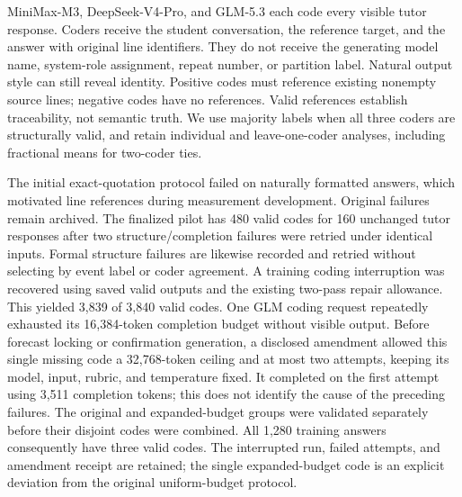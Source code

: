 MiniMax-M3, DeepSeek-V4-Pro, and GLM-5.3 each code every visible tutor response.
Coders receive the student conversation, the reference target, and the answer
with original line identifiers. They do not receive the generating model name,
system-role assignment, repeat number, or partition label. Natural output style
can still reveal identity. Positive codes must reference existing nonempty
source lines; negative codes have no references. Valid references establish
traceability, not semantic truth. We use majority labels when all three coders
are structurally valid, and retain individual and leave-one-coder analyses,
including fractional means for two-coder ties.

The initial exact-quotation protocol failed on naturally formatted answers,
which motivated line references during measurement development. Original
failures remain archived. The finalized pilot has 480 valid codes for 160
unchanged tutor responses after two structure/completion failures were retried
under identical inputs. Formal structure failures are likewise recorded and
retried without selecting by event label or coder agreement.
A training coding interruption was recovered using saved valid outputs and
the existing two-pass repair allowance. This yielded 3,839 of 3,840 valid codes.
One GLM coding request repeatedly exhausted its 16,384-token completion budget
without visible output. Before forecast locking or confirmation generation, a
disclosed amendment allowed this single missing code a 32,768-token ceiling
and at most two attempts, keeping its model, input, rubric, and temperature
fixed. It completed on the first attempt using 3,511 completion tokens; this
does not identify the cause of the preceding failures. The original and
expanded-budget groups were validated separately before their disjoint codes
were combined. All 1,280 training answers consequently have three valid codes.
The interrupted run, failed attempts, and amendment receipt are retained; the
single expanded-budget code is an explicit deviation from the original
uniform-budget protocol.

